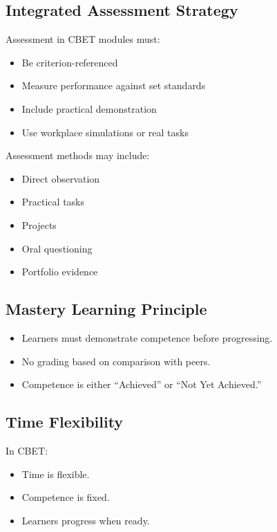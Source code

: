 \documentclass[12pt]{article}
\begin{document}
\subsection{Integrated Assessment Strategy}

Assessment in CBET modules must:

\begin{itemize}
    \item Be criterion-referenced
    \item Measure performance against set standards
    \item Include practical demonstration
    \item Use workplace simulations or real tasks
\end{itemize}

Assessment methods may include:

\begin{itemize}
    \item Direct observation
    \item Practical tasks
    \item Projects
    \item Oral questioning
    \item Portfolio evidence
\end{itemize}

\subsection{Mastery Learning Principle}

\begin{itemize}
    \item Learners must demonstrate competence before progressing.
    \item No grading based on comparison with peers.
    \item Competence is either ``Achieved'' or ``Not Yet Achieved.''
\end{itemize}

\subsection{Time Flexibility}

In CBET:

\begin{itemize}
    \item Time is flexible.
    \item Competence is fixed.
    \item Learners progress when ready.
\end{itemize}
\end{document}
